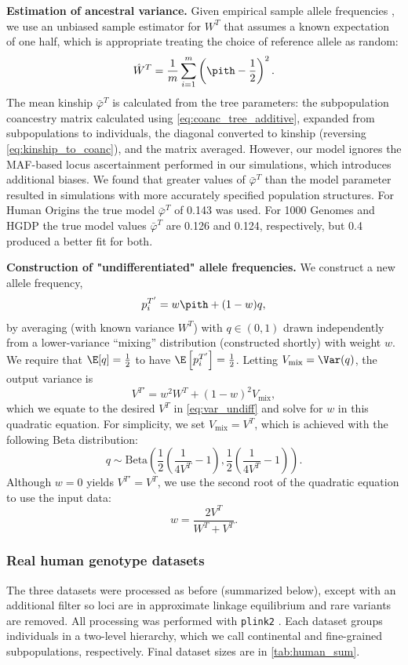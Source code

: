 \documentclass[11pt]{article}
\begin{document}
\textbf{Estimation of ancestral variance.}
Given empirical sample allele frequencies \pith, we use an unbiased sample estimator for $W^T$ that assumes a known expectation of one half, which is appropriate treating the choice of reference allele as random:
$$
\hat{W}^T
=
\frac{1}{m} \sum_{i=1}^m \left( \pith - \frac{1}{2} \right)^2
.
$$
The mean kinship $\bar{\varphi}^T$ is calculated from the tree parameters: the subpopulation coancestry matrix calculated using \cref{eq:coanc_tree_additive}, expanded from subpopulations to individuals, the diagonal converted to kinship (reversing \cref{eq:kinship_to_coanc}), and the matrix averaged.
However, our model ignores the MAF-based locus ascertainment performed in our simulations, which introduces additional biases.
We found that greater values of $\bar{\varphi}^T$ than the model parameter resulted in simulations with more accurately specified population structures.
For Human Origins the true model $\bar{\varphi}^T$ of 0.143 was used.
For 1000 Genomes and HGDP the true model values $\bar{\varphi}^T$ are 0.126 and 0.124, respectively, but 0.4 produced a better fit for both.

\textbf{Construction of "undifferentiated" allele frequencies.}
We construct a new allele frequency,
$$
p_i^{T'} = w \pith + ( 1 - w ) q,
$$
by averaging \pith (with known variance $W^T$) with $q \in (0, 1)$ drawn independently from a lower-variance ``mixing'' distribution (constructed shortly) with weight $w$.
We require that $\E[q] = \frac{1}{2}$ to have $\E \left[ p_i^{T'} \right] = \frac{1}{2}$.
Letting $V_\text{mix} = \Var(q)$, the output variance is
$$
V^{T'}
=
w^2 W^T + (1-w)^2 V_\text{mix}
,
$$
which we equate to the desired $V^T$ in \cref{eq:var_undiff} and solve for $w$ in this quadratic equation.
For simplicity, we set $V_\text{mix} = V^T$, which is achieved with the following Beta distribution:
$$
q \sim \text{Beta} \left( \frac{1}{2} \left( \frac{1}{ 4 V^T } - 1 \right), \frac{1}{2} \left( \frac{1}{ 4 V^T } - 1 \right) \right)
.
$$
Although $w=0$ yields $V^{T'} = V^T$, we use the second root of the quadratic equation to use the input \pith data:
$$
w = \frac{ 2 V^T }{ W^T + V^T }.
$$

\subsubsection{Real human genotype datasets}

The three datasets were processed as before \citep{ochoa_human} (summarized below), except with an additional filter so loci are in approximate linkage equilibrium and rare variants are removed.
All processing was performed with \texttt{plink2} \citep{chang_second-generation_2015}.
Each dataset groups individuals in a two-level hierarchy, which we call continental and fine-grained subpopulations, respectively.
Final dataset sizes are in \cref{tab:human_sum}.
\end{document}
